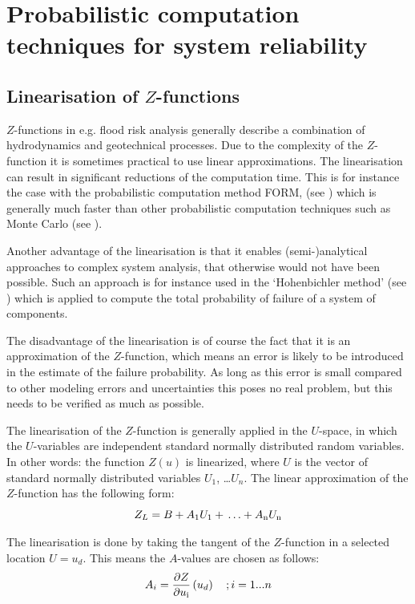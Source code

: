 \chapter{Probabilistic computation techniques for system reliability\label{chp:systemreliability}}

\section{Linearisation of $Z$-functions}\label{Section_2.2.5}
$Z$-functions in e.g. flood risk analysis generally describe a combination of hydrodynamics and geotechnical processes. Due to the complexity of the $Z$-function it is sometimes practical to use linear approximations. The linearisation can result in significant reductions of the computation time. This is for instance the case with the probabilistic computation method FORM, (see ) which is generally much faster than other probabilistic computation techniques such as Monte Carlo (see ). 

Another advantage of the linearisation is that it enables (semi-)analytical approaches to complex system analysis, that otherwise would not have been possible. Such an approach is for instance used in the `Hohenbichler method' (see ) which is applied to compute the total probability of failure of a system of components.

The disadvantage of the linearisation is of course the fact that it is an approximation of the $Z$-function, which means an error is likely to be introduced in the estimate of the failure probability. As long as this error is small compared to other modeling errors and uncertainties this poses no real problem, but this needs to be verified as much as possible.

The linearisation of the $Z$-function is generally applied in the $U$-space, in which the $U$-variables are independent standard normally distributed random variables. In other words: the function $Z(u)$ is linearized, where $U$ is the vector of standard normally distributed variables $U_1$, \dots  $U_n$. The linear approximation of the $Z$-function has the following form:
\begin{equation}
Z_L =B+A_{{\rm 1}} U_{{\rm 1}} +{\rm  }\ldots + A_{{\rm n}} U_{{\rm n}} \label{eq:2-17}  
\end{equation}

The linearisation is done by taking the tangent of the $Z$-function in a selected location $U=u_d$. This means the $A$-values are chosen as follows: 
\begin{equation}
A_{i} =\frac{\partial {Z}}{\partial u_{{\rm i}} } \left(u_{d} \right)\quad ;i=1...n  \label{eq:2-18}  
\end{equation}

